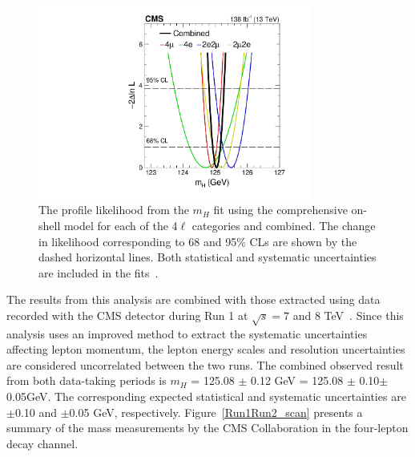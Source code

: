 \begin{figure}[!htb]
  \centering
  \includegraphics[width=0.8\textwidth]{Figure_008.pdf}
  \caption{The profile likelihood from the $m_H$ fit using the comprehensive on-shell model for each of the 4$\ell$ categories and combined.  The change in likelihood corresponding to 68 and 95\% CLs are shown by the dashed horizontal lines. Both statistical and systematic uncertainties are included in the fits~\cite{PhysRevD.111.092014}.}
  \label{MassLikelihoodScan}
\end{figure}


The results from this analysis are combined with those extracted using data recorded with the  
CMS detector during Run 1 at $\sqrt{s}= 7$ and 8 TeV~\cite{Chatrchyan:2013mxa}. 
Since this analysis uses an improved method to extract the systematic uncertainties affecting lepton momentum, 
the lepton energy scales and resolution uncertainties are considered uncorrelated between the two runs. The combined observed result from both data-taking periods is $m_H$ = 125.08 $\pm$ 0.12 GeV = 125.08 $\pm$ 0.10\stat $\pm$ 0.05\syst GeV. The corresponding expected statistical and systematic uncertainties are $\pm$0.10 and $\pm$0.05 GeV, respectively. Figure~\ref{Run1Run2_scan} presents a summary of the \Hboson mass measurements by the CMS Collaboration in the four-lepton decay channel.

